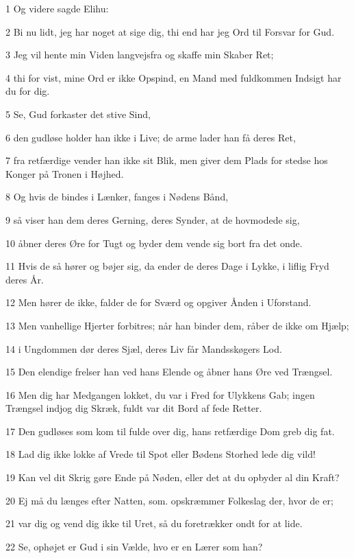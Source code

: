 \par 1 Og videre sagde Elihu:
\par 2 Bi nu lidt, jeg har noget at sige dig, thi end har jeg Ord til Forsvar for Gud.
\par 3 Jeg vil hente min Viden langvejsfra og skaffe min Skaber Ret;
\par 4 thi for vist, mine Ord er ikke Opspind, en Mand med fuldkommen Indsigt har du for dig.
\par 5 Se, Gud forkaster det stive Sind,
\par 6 den gudløse holder han ikke i Live; de arme lader han få deres Ret,
\par 7 fra retfærdige vender han ikke sit Blik, men giver dem Plads for stedse hos Konger på Tronen i Højhed.
\par 8 Og hvis de bindes i Lænker, fanges i Nødens Bånd,
\par 9 så viser han dem deres Gerning, deres Synder, at de hovmodede sig,
\par 10 åbner deres Øre for Tugt og byder dem vende sig bort fra det onde.
\par 11 Hvis de så hører og bøjer sig, da ender de deres Dage i Lykke, i liflig Fryd deres År.
\par 12 Men hører de ikke, falder de for Sværd og opgiver Ånden i Uforstand.
\par 13 Men vanhellige Hjerter forbitres; når han binder dem, råber de ikke om Hjælp;
\par 14 i Ungdommen dør deres Sjæl, deres Liv får Mandsskøgers Lod.
\par 15 Den elendige frelser han ved hans Elende og åbner hans Øre ved Trængsel.
\par 16 Men dig har Medgangen lokket, du var i Fred for Ulykkens Gab; ingen Trængsel indjog dig Skræk, fuldt var dit Bord af fede Retter.
\par 17 Den gudløses som kom til fulde over dig, hans retfærdige Dom greb dig fat.
\par 18 Lad dig ikke lokke af Vrede til Spot eller Bødens Storhed lede dig vild!
\par 19 Kan vel dit Skrig gøre Ende på Nøden, eller det at du opbyder al din Kraft?
\par 20 Ej må du længes efter Natten, som. opskræmmer Folkeslag der, hvor de er;
\par 21 var dig og vend dig ikke til Uret, så du foretrækker ondt for at lide.
\par 22 Se, ophøjet er Gud i sin Vælde, hvo er en Lærer som han?
